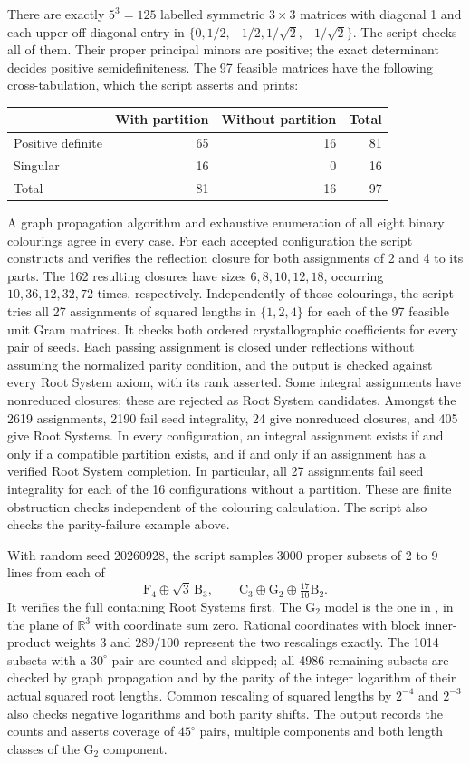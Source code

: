 \documentclass[11pt]{amsart}
\newcommand\re{{\mathbb R}}%
\theoremstyle{definition}
\newcommand{\typ}[1]{\mathrm{#1}}
\begin{document}
There are exactly $5^3=125$ labelled symmetric $3\times3$ matrices
with diagonal 1 and each upper off-diagonal entry in
$\{0,1/2,-1/2,1/\sqrt2,-1/\sqrt2\}$. The script checks all of them.
Their proper principal minors are positive; the exact determinant
decides positive semidefiniteness. The 97 feasible matrices have the
following cross-tabulation, which the script asserts and prints:
\begin{center}
\begin{tabular}{@{}lrrr@{}}
\toprule
&With partition&Without partition&Total\\\midrule
Positive definite&65&16&81\\
Singular&16&0&16\\\midrule
Total&81&16&97\\\bottomrule
\end{tabular}
\end{center}
A graph propagation algorithm and exhaustive enumeration
of all eight binary colourings agree in every case. For each accepted
configuration the script constructs and verifies the reflection closure
for both assignments of 2 and 4 to its parts. The 162 resulting closures
have sizes $6,8,10,12,18$, occurring $10,36,12,32,72$ times, respectively.
Independently of those colourings, the script tries all 27 assignments
of squared lengths in $\{1,2,4\}$ for each of the 97 feasible unit
Gram matrices. It checks both ordered crystallographic coefficients
for every pair of seeds. Each passing assignment is closed under
reflections without assuming the normalized parity condition, and
the output is checked against every Root System axiom, with its rank
asserted. Some integral assignments have nonreduced closures; these are
rejected as Root System candidates. Amongst the 2619 assignments, 2190
fail seed integrality, 24 give nonreduced closures, and 405 give Root
Systems. In every configuration, an integral assignment exists if
and only if a compatible partition exists, and if and only if an
assignment has a verified Root System completion. In particular, all
27 assignments fail seed integrality for each of the 16 configurations
without a partition. These are finite obstruction checks independent
of the colouring calculation. The script also checks the parity-failure
example above.

With random seed 20260928, the script samples 3000 proper subsets of
2 to 9 lines from each of
\[
 \typ F_4\oplus\sqrt3\,\typ B_3,
 \qquad \typ C_3\oplus\typ G_2\oplus\tfrac{17}{10}\typ B_2.
\]
It verifies the full containing Root Systems first. The $\typ G_2$
model is the one in \cite[coordinate-model section]{R311}, in the
plane of $\re^3$ with coordinate sum zero. Rational coordinates with
block inner-product weights 3 and $289/100$ represent the two rescalings
exactly. The 1014 subsets with a $30^\circ$ pair are counted and skipped;
all 4986 remaining subsets are checked by graph propagation and by the parity of
the integer logarithm of their actual squared root lengths. Common
rescaling of squared lengths by $2^{-4}$ and $2^{-3}$ also checks negative
logarithms and both parity shifts. The output records the counts and
asserts coverage of $45^\circ$ pairs, multiple components and both
length classes of the $\typ G_2$ component.
\end{document}

